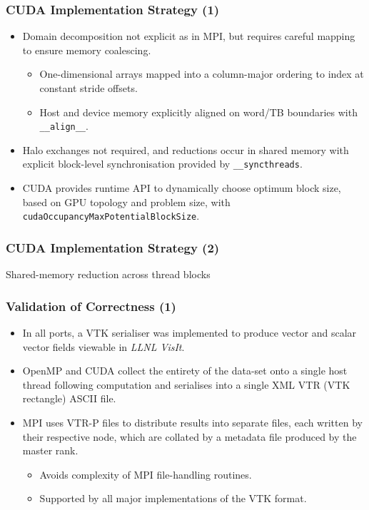 \documentclass[aspectratio=169]{beamer}
\numberwithin{figure}{section}
\begin{document}
\begin{frame}
    \frametitle{CUDA Implementation Strategy (1)}
    \begin{itemize}
        \item Domain decomposition not explicit as in MPI, but requires careful
            mapping to ensure memory coalescing.
            \begin{itemize}
                \item One-dimensional arrays mapped into a column-major ordering
                    to index at constant stride offsets.
                \item Host and device memory explicitly aligned on word/TB
                    boundaries with \texttt{\_\_align\_\_}.
            \end{itemize}
        \item Halo exchanges not required, and reductions occur in shared
            memory with explicit block-level synchronisation provided by
            \texttt{\_\_syncthreads}. 
        \item CUDA provides runtime API to dynamically choose optimum block
            size, based on GPU topology and problem size, with
            \texttt{cudaOccupancyMaxPotentialBlockSize}.
    \end{itemize}
\end{frame}
\begin{frame}
    \frametitle{CUDA Implementation Strategy (2)}
    \begin{center}
        \begin{minipage}{.6\textwidth}
            
        \end{minipage}\vfill%
        Shared-memory reduction across thread blocks
    \end{center}
\end{frame}
\begin{frame}
    \frametitle{Validation of Correctness (1)}
    \begin{itemize}
        \item In all ports, a VTK serialiser was implemented to produce vector
            and scalar vector fields viewable in \emph{LLNL VisIt}.
        \item OpenMP and CUDA collect the entirety of the data-set onto a single
            host thread following computation and serialises into a single XML
            VTR (VTK rectangle) ASCII file.
        \item MPI uses VTR-P files to distribute results into separate files,
            each written by their respective node, which are collated by a
            metadata file produced by the master rank.
            \begin{itemize}
                \item Avoids complexity of MPI file-handling routines.
                \item Supported by all major implementations of the VTK format.
            \end{itemize}
    \end{itemize}
\end{frame}
\end{document}
